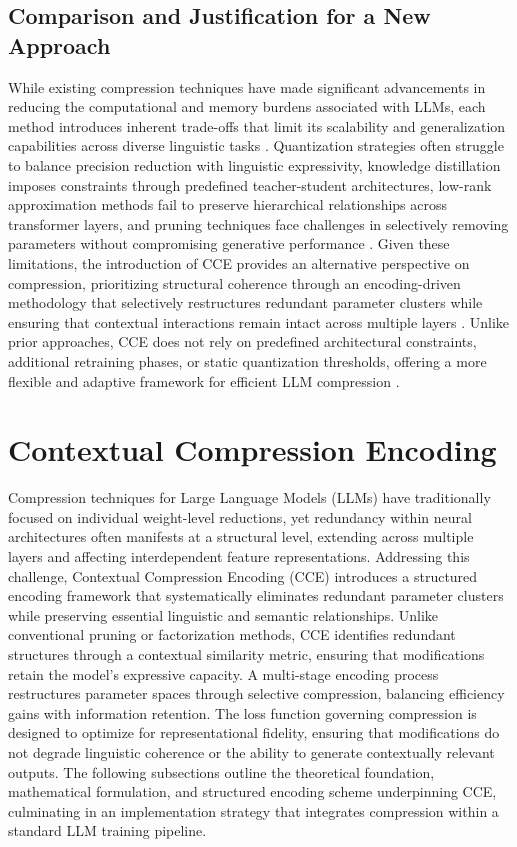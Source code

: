 \documentclass{article}
\begin{document}
\subsection{Comparison and Justification for a New Approach}
While existing compression techniques have made significant advancements in reducing the computational and memory burdens associated with LLMs, each method introduces inherent trade-offs that limit its scalability and generalization capabilities across diverse linguistic tasks \cite{sato2024reducing}. Quantization strategies often struggle to balance precision reduction with linguistic expressivity, knowledge distillation imposes constraints through predefined teacher-student architectures, low-rank approximation methods fail to preserve hierarchical relationships across transformer layers, and pruning techniques face challenges in selectively removing parameters without compromising generative performance \cite{gomez2024enhancing}. Given these limitations, the introduction of CCE provides an alternative perspective on compression, prioritizing structural coherence through an encoding-driven methodology that selectively restructures redundant parameter clusters while ensuring that contextual interactions remain intact across multiple layers \cite{tippins2024domain}. Unlike prior approaches, CCE does not rely on predefined architectural constraints, additional retraining phases, or static quantization thresholds, offering a more flexible and adaptive framework for efficient LLM compression \cite{hawks2024neural}.




\section{Contextual Compression Encoding}

Compression techniques for Large Language Models (LLMs) have traditionally focused on individual weight-level reductions, yet redundancy within neural architectures often manifests at a structural level, extending across multiple layers and affecting interdependent feature representations. Addressing this challenge, Contextual Compression Encoding (CCE) introduces a structured encoding framework that systematically eliminates redundant parameter clusters while preserving essential linguistic and semantic relationships. Unlike conventional pruning or factorization methods, CCE identifies redundant structures through a contextual similarity metric, ensuring that modifications retain the model's expressive capacity. A multi-stage encoding process restructures parameter spaces through selective compression, balancing efficiency gains with information retention. The loss function governing compression is designed to optimize for representational fidelity, ensuring that modifications do not degrade linguistic coherence or the ability to generate contextually relevant outputs. The following subsections outline the theoretical foundation, mathematical formulation, and structured encoding scheme underpinning CCE, culminating in an implementation strategy that integrates compression within a standard LLM training pipeline.
\end{document}
